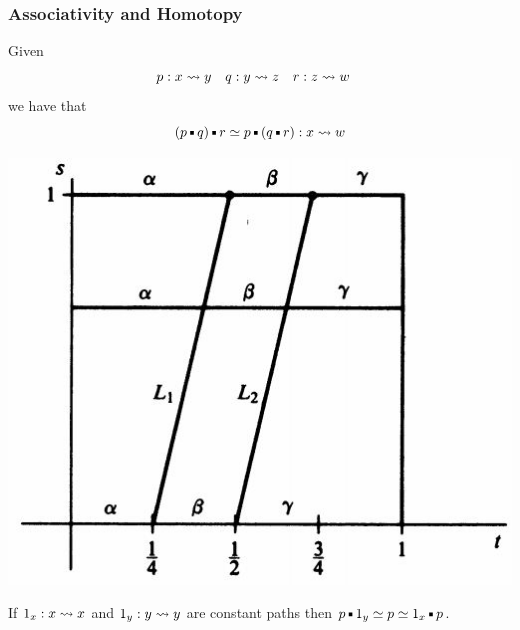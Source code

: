 \documentclass[handout]{beamer} %
\begin{document}

\begin{frame}
  \frametitle{Associativity and Homotopy}
  \small
  Given 
  \begin{align*}
    p &: x \rightsquigarrow y
    &
    q &: y \rightsquigarrow z
    &
    r &: z \rightsquigarrow w
  \end{align*}
  we have that
  \[
    (p \Concat q) \Concat r \simeq p \Concat (q \Concat r) : x \Path w
  \]

  \begin{center}
    \includegraphics[scale=0.3]{assoc.jpg}
  \end{center}
  
  If $1_x : x \rightsquigarrow x$ and $1_y : y \rightsquigarrow y$ are constant paths then
  $
    p \Concat 1_y \simeq p \simeq 1_x \Concat p
  $.
\end{frame}
\end{document}
